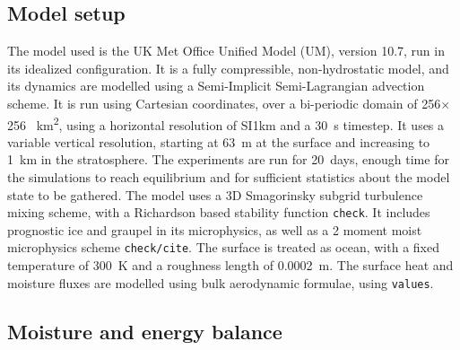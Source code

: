 \documentclass[11pt,a4paper]{article}
\newcommand\todo[1]{\texttt{#1}}
\begin{document}
\subsection{Model setup}


The model used is the UK Met Office Unified Model (UM), version 10.7, run in its idealized configuration. It is a fully compressible, non-hydrostatic model, and its dynamics are modelled using a Semi-Implicit Semi-Lagrangian advection scheme. It is run using Cartesian coordinates, over a bi-periodic domain of 256$\times$256 \SI{}{km^2}, using a horizontal resolution of SI{1}{km} and a \SI{30}{s} timestep. It uses a variable vertical resolution, starting at \SI{63}{m} at the surface and increasing to \SI{1}{km} in the stratosphere. 
The experiments are run for \SI{20}{days}, enough time for the simulations to reach equilibrium and for sufficient statistics about the model state to be gathered. The model uses a 3D Smagorinsky subgrid turbulence mixing scheme, with a Richardson based stability function \todo{check}. It includes prognostic ice and graupel in its microphysics, as well as a 2 moment moist microphysics scheme \todo{check/cite}. The surface is treated as ocean, with a fixed temperature of \SI{300}{K} and a roughness length of \SI{0.0002}{m}. The surface heat and moisture fluxes are modelled using bulk aerodynamic formulae, using \todo{values}.

\subsection{Moisture and energy balance}
\end{document}
